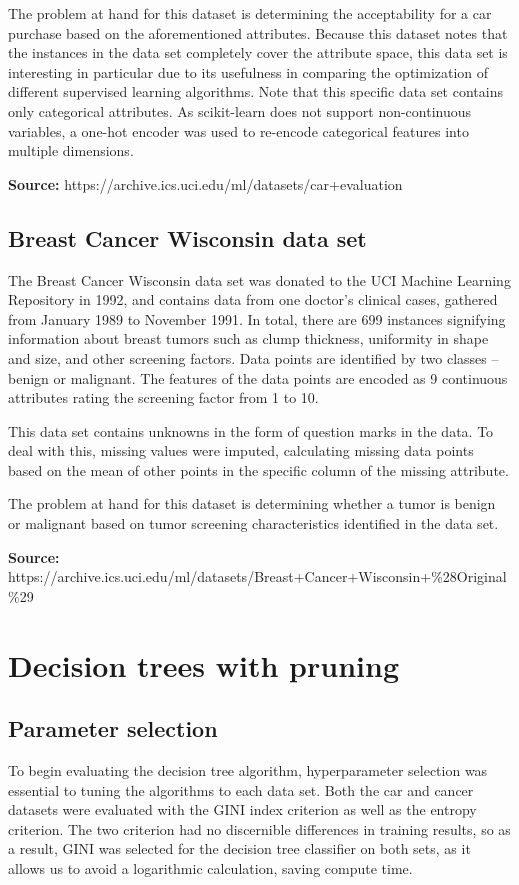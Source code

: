 \documentclass{article}
\begin{document}
    The problem at hand for this dataset is determining the acceptability for a car purchase based on the aforementioned attributes. Because this dataset notes that the instances in the data set completely cover the attribute space, this data set is interesting in particular due to its usefulness in comparing the optimization of different supervised learning algorithms. Note that this specific data set contains only categorical attributes. As scikit-learn does not support non-continuous variables, a one-hot encoder was used to re-encode categorical features into multiple dimensions.

    \textbf{Source:} https://archive.ics.uci.edu/ml/datasets/car+evaluation

    \subsection{Breast Cancer Wisconsin data set}
    The Breast Cancer Wisconsin data set was donated to the UCI Machine Learning Repository in 1992, and contains data from one doctor's clinical cases, gathered from January 1989 to November 1991. In total, there are 699 instances signifying information about breast tumors such as clump thickness, uniformity in shape and size, and other screening factors. Data points are identified by two classes -- benign or malignant. The features of the data points are encoded as 9 continuous attributes rating the screening factor from 1 to 10.

    This data set contains unknowns in the form of question marks in the data. To deal with this, missing values were imputed, calculating missing data points based on the mean of other points in the specific column of the missing attribute. 

    The problem at hand for this dataset is determining whether a tumor is benign or malignant based on tumor screening characteristics identified in the data set.

    \textbf{Source:} https://archive.ics.uci.edu/ml/datasets/Breast+Cancer+Wisconsin+\%28Original\%29

    \section{Decision trees with pruning}

    \subsection{Parameter selection}
    To begin evaluating the decision tree algorithm, hyperparameter selection was essential to tuning the algorithms to each data set. Both the car and cancer datasets were evaluated with the GINI index criterion as well as the entropy criterion. The two criterion had no discernible differences in training results, so as a result, GINI was selected for the decision tree classifier on both sets, as it allows us to avoid a logarithmic calculation, saving compute time.
\end{document}
